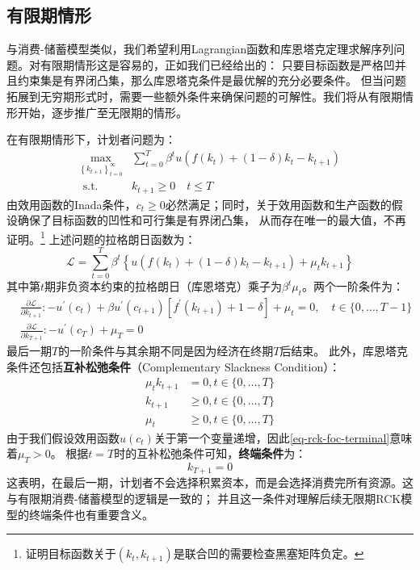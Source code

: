 \subsection{有限期情形} \label{subsec-rck-finite}

与消费-储蓄模型类似，我们希望利用Lagrangian函数和库恩塔克定理求解序列问题。对有限期情形这是容易的，正如我们已经给出的：
只要目标函数是严格凹并且约束集是有界闭凸集，那么库恩塔克条件是最优解的充分必要条件。
但当问题拓展到无穷期形式时，需要一些额外条件来确保问题的可解性。我们将从有限期情形开始，逐步推广至无限期的情形。

在有限期情形下，计划者问题为：
\begin{equation*}
    \begin{aligned}
        \max_{\left\{k_{t+1}\right\}_{t=0}^{\infty}} & \sum_{t=0}^T \beta^t 
            u\left(f\left(k_t\right)+\left(1-\delta\right)k_t-k_{t+1}\right)    \\
        \text { s.t. } & k_{t+1} \geq 0 \quad t \leq T
    \end{aligned}
\end{equation*}
由效用函数的Inada条件，$c_t\geq 0$必然满足；同时，关于效用函数和生产函数的假设确保了目标函数的凹性和可行集是有界闭凸集，
从而存在唯一的最大值，不再证明。\footnote{证明目标函数关于$(k_t,k_{t+1})$是联合凹的需要检查黑塞矩阵负定。}
上述问题的拉格朗日函数为：
\begin{equation*}
    \mathcal{L}
        = \sum_{t=0}^T \beta^t\left\{u\left(f\left(k_t\right)+(1-\delta) k_t-k_{t+1}\right)+\mu_t k_{t+1}\right\}
\end{equation*}
其中第$t$期非负资本约束的拉格朗日（库恩塔克）乘子为$\beta^t \mu_t$。两个一阶条件为：
\begin{align}
    & \frac{\partial \mathcal{L}}{\partial k_{t+1}}:
        -u^{\prime}\left(c_t\right)+\beta u^{\prime}\left(c_{t+1}\right)
        \left[f^{\prime}\left(k_{t+1}\right)+1-\delta\right]+\mu_t=0, \quad t \in\{0, \ldots, T-1\} 
        \label{eq-rck-foc-before-terminal}  \\
    & \frac{\partial \mathcal{L}}{\partial k_{T+1}}:
        -u^{\prime}\left(c_T\right)+\mu_T = 0   \label{eq-rck-foc-terminal}
\end{align}
最后一期$T$的一阶条件与其余期不同是因为经济在终期$T$后结束。
此外，库恩塔克条件还包括\textbf{互补松弛条件}（Complementary Slackness Condition）：
\begin{equation}
    \begin{aligned}
        \mu_t k_{t+1} & =0, t \in\{0, \ldots, T\} \\
        k_{t+1} & \geq 0, t \in\{0, \ldots, T\} \\
        \mu_t & \geq 0, t \in\{0, \ldots, T\} 
    \end{aligned}
\end{equation}
由于我们假设效用函数$u(c_t)$关于第一个变量递增，因此\cref{eq-rck-foc-terminal}意味着$\mu_T>0$。
根据$t=T$时的互补松弛条件可知，\textbf{终端条件}为：
\begin{equation*}
    k_{T+1} = 0
\end{equation*}
这表明，在最后一期，计划者不会选择积累资本，而是会选择消费完所有资源。这与有限期消费-储蓄模型的逻辑是一致的；
并且这一条件对理解后续无限期RCK模型的终端条件也有重要含义。

